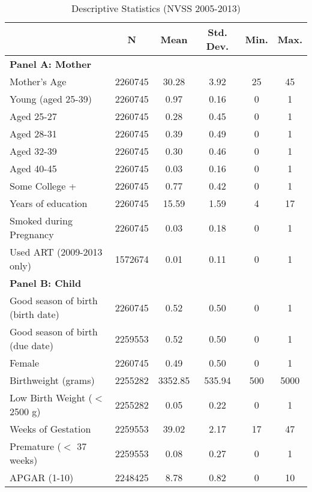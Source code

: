 \documentclass[a4paper, 11.5 pt]{article}
\theoremstyle{plain}
\begin{document}
\begin{doublespace}
\begin{table}[htpb!]
 \begin{center}
\caption{Descriptive Statistics (NVSS 2005-2013)}
 \label{bqTab:SumStatsMain}\begin{tabular}{lccccc}
 \toprule\toprule \vspace{5mm}
& N & Mean & Std. Dev. & Min. & Max. \\ \midrule
\multicolumn{6}{l}{\textbf{Panel A: Mother}} \\
Mother's Age        &     2260745&       30.28&        3.92&          25&          45\\
Young (aged 25-39)  &     2260745&        0.97&        0.16&           0&           1\\
Aged 25-27          &     2260745&        0.28&        0.45&           0&           1\\
Aged 28-31          &     2260745&        0.39&        0.49&           0&           1\\
Aged 32-39          &     2260745&        0.30&        0.46&           0&           1\\
Aged 40-45          &     2260745&        0.03&        0.16&           0&           1\\
Some College +&     2260745&        0.77&        0.42&           0&           1\\
Years of education  &     2260745&       15.59&        1.59&           4&          17\\
Smoked during Pregnancy&     2260745&        0.03&        0.18&           0&           1\\
Used ART (2009-2013 only)&     1572674&        0.01&        0.11&           0&           1\\

 \multicolumn{6}{l}{\textbf{Panel B: Child}}\\
 Good season of birth (birth date)&     2260745&        0.52&        0.50&           0&           1\\
Good season of birth (due date)&     2259553&        0.52&        0.50&           0&           1\\
Female              &     2260745&        0.49&        0.50&           0&           1\\
Birthweight (grams) &     2255282&     3352.85&      535.94&         500&        5000\\
Low Birth Weight ($<$2500 g)&     2255282&        0.05&        0.22&           0&           1\\
Weeks of Gestation  &     2259553&       39.02&        2.17&          17&          47\\
Premature ($<$ 37 weeks)&     2259553&        0.08&        0.27&           0&           1\\
APGAR (1-10)        &     2248425&        8.78&        0.82&           0&          10\\


\end{tabular}
\end{center}
\end{table}
\end{doublespace}
\end{document}
